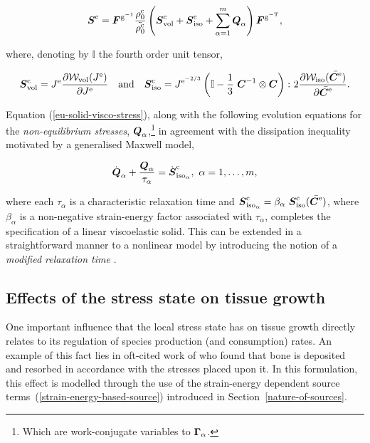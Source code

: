 \begin{equation}
\mbox{\boldmath$ S$}^{\mathrm{c}} = \mbox{\boldmath$ F$}^{\mathrm{g}^{\mathrm{-1}}}
\frac{\rho_{0}^{\mathrm{c}}}{\tilde{\rho_{0}^{\mathrm{c}}}}\left(
\mbox{\boldmath$ S$}^{\mathrm{c}}_{\mathrm{vol}}+\mbox{\boldmath$ S$}^{\mathrm{c}}_{\mathrm{iso}}+
\sum_{\alpha=1}^{m}\mbox{\boldmath$ Q$}_{\alpha} \right)
\mbox{\boldmath$ F$}^{\mathrm{g}^{\mathrm{-T}}},
\label{eu-solid-visco-stress}
\end{equation}

\noindent where, denoting by $\mathbb{I}$ the fourth order unit
tensor,

\begin{equation*}
\mbox{\boldmath$ S$}^{\mathrm{c}}_{\mathrm{vol}} = J^{\mathrm{e}} \frac{\partial
  {\mathcal W}_{\mathrm{vol}}(J^{\mathrm{e}})}{\partial J^{\mathrm{e}}} \quad
\mathrm{and} \quad \mbox{\boldmath$ S$}^{\mathrm{c}}_{\mathrm{iso}} =
J^{\mathrm{e}^{-2/3}} \left(\mathbb{I} - \frac{1}{3}\ \mbox{\boldmath$ C$}^{-1} \otimes
\mbox{\boldmath$ C$} \right) \colon 2 
\frac{\partial{\mathcal W}_{\mathrm{iso}}(\bar{\mbox{\boldmath$ C$}^{\mathrm{e}}})}{\partial
  \bar{\mbox{\boldmath$ C$}^{\mathrm{e}}}}.
\end{equation*}

\noindent Equation (\ref{eu-solid-visco-stress}), along with the
following evolution equations for the {\em non-equilibrium stresses},
$\mbox{\boldmath$ Q$}_{\alpha}$,\footnote{Which are work-conjugate variables to
  $\mbox{\boldmath$\Gamma$}_{\alpha}$.} in agreement with the dissipation inequality
motivated by a generalised Maxwell model,

\begin{equation}
\dot{\mbox{\boldmath$ Q$}}_{\alpha}+\frac{\mbox{\boldmath$ Q$}_{\alpha}}{\tau_{\alpha}} =
\dot{\mbox{\boldmath$ S$}}^{\mathrm{c}}_{\mathrm{iso}_{\alpha}},\ \alpha=1,\ldots,m,
\label{eu-linearviscoelasticity}
\end{equation}

\noindent where each $\tau_{\alpha}$ is a characteristic relaxation
time and $\mbox{\boldmath$ S$}^{\mathrm{c}}_{\mathrm{iso}_{\alpha}} =
\beta_{\alpha}\ \mbox{\boldmath$ S$}^{\mathrm{c}}_{\mathrm{iso}}
(\bar{\mbox{\boldmath$ C$}^{\mathrm{e}}})$, where $\beta_{\alpha}$ is a non-negative
strain-energy factor associated with $\tau_{\alpha}$, completes the
specification of a linear viscoelastic solid. This can be extended in
a straightforward manner to a nonlinear model by introducing the
notion of a {\em modified relaxation time} \citep{Eyring:36}.

\subsection{Effects of the stress state on tissue growth}
\label{eu-stress-dependent-growth}

One important influence that the local stress state has on tissue
growth directly relates to its regulation of species production (and
consumption) rates. An example of this fact lies in oft-cited work of
\citet{wolff1892} who found that bone is deposited and resorbed in
accordance with the stresses placed upon it. In this formulation, this
effect is modelled through the use of the strain-energy dependent
source terms~(\ref{strain-energy-based-source}) introduced in
Section~\ref{nature-of-sources}.

